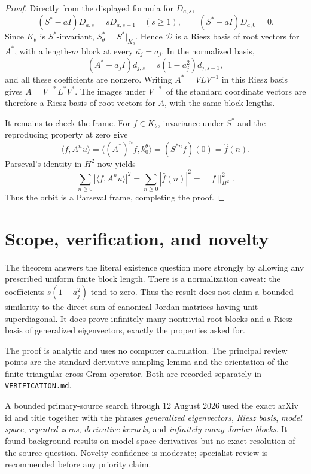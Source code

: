 \documentclass[11pt]{article}
\theoremstyle{remark}
\begin{document}
\begin{proof}
Directly from the displayed formula for \(D_{a,s}\),
\[
 (S^*-\overline a I)D_{a,s}=sD_{a,s-1}\quad(s\ge1),
 \qquad (S^*-\overline a I)D_{a,0}=0.
\]
Since \(K_\theta\) is \(S^*\)-invariant, \(S_\theta^*=S^*|_{K_\theta}\).
Hence \(\mathcal D\) is a Riesz basis of root vectors for \(A^*\), with a
length-\(m\) block at every \(\overline{a_j}=a_j\). In the normalized basis,
\[
 (A^*-a_jI)d_{j,s}=s(1-a_j^2)d_{j,s-1},
\]
and all these coefficients are nonzero. Writing \(A^*=VLV^{-1}\) in this
Riesz basis gives \(A=V^{-*}L^*V^*\). The images under \(V^{-*}\) of the
standard coordinate vectors are therefore a Riesz basis of root vectors for
\(A\), with the same block lengths.

It remains to check the frame. For \(f\in K_\theta\), invariance under \(S^*\)
and the reproducing property at zero give
\[
 \langle f,A^nu\rangle
 =\langle (A^*)^nf,k_0^\theta\rangle
 =(S^{*n}f)(0)=\widehat f(n).
\]
Parseval's identity in \(H^2\) now yields
\[
 \sum_{n\ge0}|\langle f,A^nu\rangle|^2
 =\sum_{n\ge0}|\widehat f(n)|^2=\|f\|_{H^2}^2.
\]
Thus the orbit is a Parseval frame, completing the proof.
\end{proof}

\section{Scope, verification, and novelty}

The theorem answers the literal existence question more strongly by allowing
any prescribed uniform finite block length. There is a normalization caveat:
the coefficients \(s(1-a_j^2)\) tend to zero. Thus the result does not claim
a bounded similarity to the direct sum of canonical Jordan matrices having
unit superdiagonal. It does prove infinitely many nontrivial root blocks and
a Riesz basis of generalized eigenvectors, exactly the properties asked for.

The proof is analytic and uses no computer calculation. The principal review
points are the standard derivative-sampling lemma and the orientation of the
finite triangular cross-Gram operator. Both are recorded separately in
\texttt{VERIFICATION.md}.

A bounded primary-source search through 12 August 2026 used the exact arXiv
id and title together with the phrases \emph{generalized eigenvectors},
\emph{Riesz basis}, \emph{model space}, \emph{repeated zeros},
\emph{derivative kernels}, and \emph{infinitely many Jordan blocks}. It found
background results on model-space derivatives but no exact resolution of the
source question. Novelty confidence is moderate; specialist review is
recommended before any priority claim.
\end{document}
